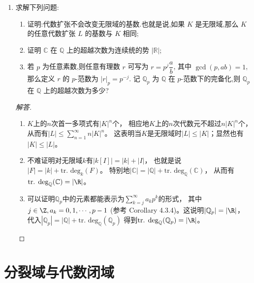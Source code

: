 \begin{enumerate}
    超越基的基数称为 $F$ 在 $k$ 上的超越次数 (transcendence degree),记作 $\text{tr.\,deg}_k(F)$.

    \item 求解下列问题:
    \begin{enumerate}[label=(\arabic*)]
        \item 证明:代数扩张不会改变无限域的基数.也就是说,如果 $K$ 是无限域,那么 $K$ 的任意代数扩张 $L$ 的基数与 $K$ 相同;
        \item 证明 $\mathbb{C}$ 在 $\mathbb{Q}$ 上的超越次数为连续统的势 $|\mathbb{R}|$;
        \item 若 $p$ 为任意素数,则任意有理数 $r$ 可写为 $r = p^j \dfrac{a}{b}$,
        其中 $\gcd(p, ab) = 1$,那么定义 $r$ 的 $p$-范数为 $|r|_p = p^{-j}$.
        记 $\mathbb{Q}_p$ 为 $\mathbb{Q}$ 在 $p$-范数下的完备化,则 $\mathbb{Q}_p$ 在 $\mathbb{Q}$ 上的超越次数为多少?
    \end{enumerate}
    \begin{proof}[解答]
        \begin{enumerate}[label=(\arabic*)]
        \item $K$上的$n$次首一多项式有$|K|^n$个，
        相应地$K$上的$n$次代数元不超过$n|K|^n$个，
        从而有$|L|\leqslant\sum\limits_{n=1}^{\infty}n|K|^n$。
        这表明当$K$是无限域时$|L|\leqslant|K|$；显然也有$|K|\leqslant|L|$。
        \item 不难证明对无限域$k$有$|k[I]|=|k|+|I|$，
        也就是说$|F|=|k|+\text{tr. deg}_k(F)$。
        特别地$|\mathbb{C}|=|\mathbb{Q}|+\text{tr. deg}_\mathbb{Q}(\mathbb{C})$，
        从而有$\text{tr. deg}_\mathbb{Q}(\mathbb{C})=|\R|$。
        \item 可以证明$\mathbb{Q}_p$中的元素都能表示为$\sum\limits_{k=j}^{\infty}a_kp^k$的形式，
        其中$j\in\Z,a_k=0,1,\cdots,p-1$ (参考\cite{Go} Corollary 4.3.4)。这说明$|\mathbb{Q}_p|=|\R|$，
        代入$|\mathbb{Q}_p|=|\mathbb{Q}|+\text{tr. deg}_\mathbb{Q}(\mathbb{Q}_p)$
        得到$\text{tr. deg}_\mathbb{Q}(\mathbb{Q}_p)=|\R|$。\qedhere
        \end{enumerate}
    \end{proof}
\end{enumerate}

\section{分裂域与代数闭域}

